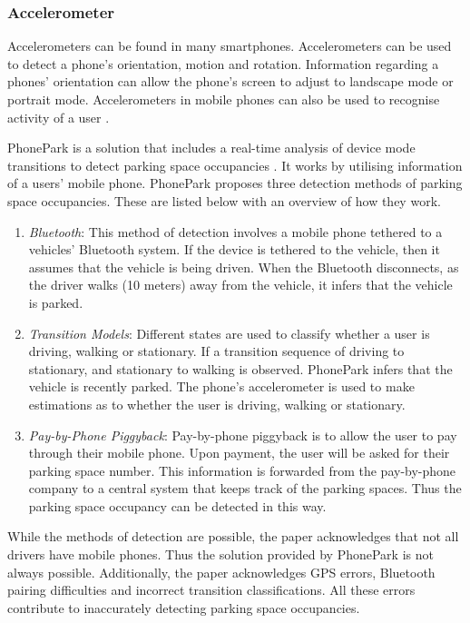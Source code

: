 \subsubsection*{Accelerometer}
Accelerometers can be found in many smartphones. Accelerometers can be used to detect a phone's orientation, motion and rotation. Information regarding a phones' orientation can allow the phone's screen to adjust to landscape mode or portrait mode. Accelerometers in mobile phones can also be used to recognise activity of a user \citep{Brezmes2009ActivityPhone}.

PhonePark is a solution that includes a real-time analysis of device mode transitions to detect parking space occupancies \citep{xu_real-time_2013}. It works by utilising information of a users' mobile phone. PhonePark proposes three detection methods of parking space occupancies. These are listed below with an overview of how they work.

\begin{enumerate}
    \item \textit{Bluetooth}: This method of detection involves a mobile phone tethered to a vehicles' Bluetooth system. If the device is tethered to the vehicle, then it assumes that the vehicle is being driven. When the Bluetooth disconnects, as the driver walks (10 meters) away from the vehicle, it infers that the vehicle is parked. 
    \item \textit{Transition Models}: Different states are used to classify whether a user is driving, walking or stationary. If a transition sequence of driving to stationary, and stationary to walking is observed. PhonePark infers that the vehicle is recently parked. The phone's accelerometer is used to make estimations as to whether the user is driving, walking or stationary.
    \item \textit{Pay-by-Phone Piggyback}: Pay-by-phone piggyback is to allow the user to pay through their mobile phone. Upon payment, the user will be asked for their parking space number. This information is forwarded from the pay-by-phone company to a central system that keeps track of the parking spaces. Thus the parking space occupancy can be detected in this way.
\end{enumerate}

While the methods of detection are possible, the paper acknowledges that not all drivers have mobile phones. Thus the solution provided by PhonePark is not always possible. Additionally, the paper acknowledges GPS errors, Bluetooth pairing difficulties and incorrect transition classifications. All these errors contribute to inaccurately detecting parking space occupancies.